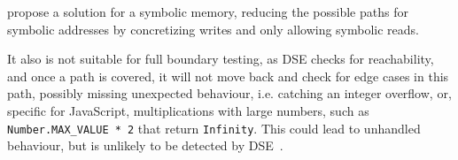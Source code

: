 \citet{cha_unleashing_2012} propose a solution for a symbolic memory, reducing the possible paths for symbolic addresses by concretizing writes and only allowing symbolic reads.    

It also is not suitable for full boundary testing, as DSE checks for reachability, and once a path is covered, it will not move back and check for edge cases in this path, possibly missing unexpected behaviour, i.e. catching an integer overflow, or, specific for JavaScript, multiplications with large numbers, such as \lstinline{Number.MAX_VALUE * 2} that return \lstinline{Infinity}. This could lead to unhandled behaviour, but is unlikely to be detected by DSE~\cite{berthier_efficient_2023}.




